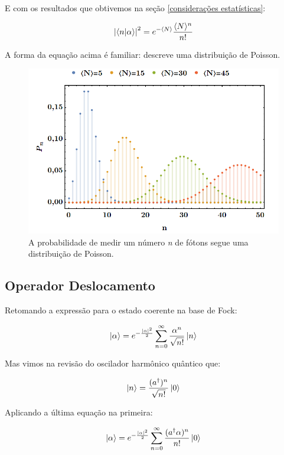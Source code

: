 \documentclass[12pt,a4paper]{report}
\begin{document}
E com os resultados que obtivemos na seção \ref{considerações estatísticas}:

\begin{equation*}
     \abs{\braket{n}{\alpha}}^2=e^{-\langle N \rangle}\frac{\langle N \rangle^n}{n!} 
\end{equation*}

A forma da equação acima é familiar: descreve uma distribuição de Poisson.

\begin{figure}[H]
    \centering
    \includegraphics[width=0.7\linewidth]{Poisson.png}
    \caption{A probabilidade de medir um número \textit{n} de fótons segue uma distribuição de Poisson.}
    \label{Poisson}
\end{figure}

\subsection{Operador Deslocamento}

Retomando a expressão para o estado coerente na base de Fock:

\begin{equation}
   \ket{\alpha}=e^{-\frac{\abs{\alpha}^2}{2}}\sum_{n=0}^{\infty}\frac{\alpha^n}{\sqrt{n!}}\ket{n}
\end{equation}

Mas vimos na revisão do oscilador harmônico quântico que:

\begin{equation}
    \ket{n}={\frac{(a^{\dag})^n}{\sqrt{n!}}}\ket{0}
\end{equation}

Aplicando a última equação na primeira:

\begin{equation}
   \ket{\alpha}=e^{-\frac{\abs{\alpha}^2}{2}}\sum_{n=0}^{\infty}\frac{(a^{\dag}\alpha)^n}{n!}\ket{0}
\end{equation}
\end{document}
